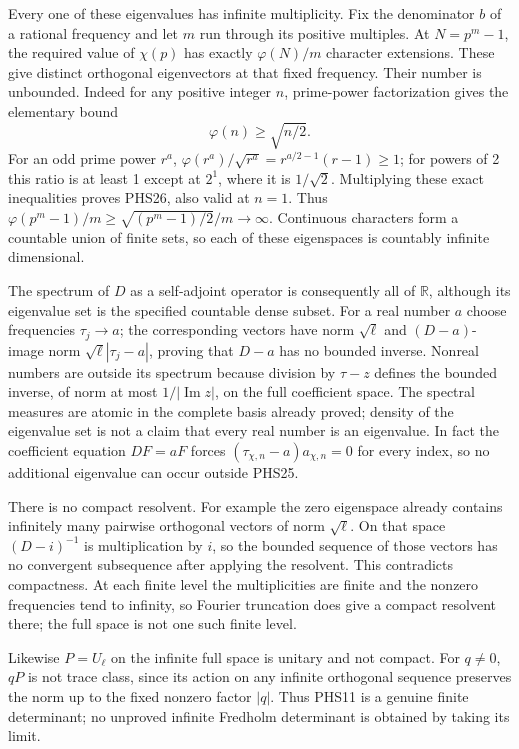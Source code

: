 Every one of these eigenvalues has infinite multiplicity.
Fix the denominator $b$ of a rational frequency and let $m$ run
through its positive multiples. At $N=p^m-1$, the required value
of $\chi(p)$ has exactly $\varphi(N)/m$ character extensions.
These give distinct orthogonal eigenvectors at that fixed frequency.
Their number is unbounded. Indeed for any positive integer $n$,
prime-power factorization gives the elementary bound
\begin{equation}\tag{PHS26}
 \varphi(n)\ge\sqrt{n/2}.
\end{equation}
For an odd prime power $r^a$,
$\varphi(r^a)/\sqrt{r^a}=r^{a/2-1}(r-1)\ge1$;
for powers of 2 this ratio is at least 1 except at $2^1$,
where it is $1/\sqrt2$. Multiplying these exact inequalities
proves PHS26, also valid at $n=1$. Thus
$\varphi(p^m-1)/m\ge\sqrt{(p^m-1)/2}/m\to\infty$.
Continuous characters form a countable union of finite sets, so
each of these eigenspaces is countably infinite dimensional.

The spectrum of $D$ as a self-adjoint operator is consequently
all of $\mathbb R$, although its eigenvalue set is the specified
countable dense subset. For a real number $a$ choose frequencies
$\tau_j\to a$; the corresponding vectors have norm $\sqrt\ell$
and $(D-a)$-image norm $\sqrt\ell|\tau_j-a|$, proving that
$D-a$ has no bounded inverse. Nonreal numbers are outside its
spectrum because division by $\tau-z$ defines the bounded inverse,
of norm at most $1/|\operatorname{Im}z|$, on the full coefficient
space. The spectral measures are atomic in the complete basis
already proved; density of the eigenvalue set is not a claim that
every real number is an eigenvalue.
In fact the coefficient equation $DF=aF$ forces
$(\tau_{\chi,n}-a)a_{\chi,n}=0$ for every index, so no additional
eigenvalue can occur outside PHS25.

There is no compact resolvent. For example the zero eigenspace
already contains infinitely many pairwise orthogonal vectors of
norm $\sqrt\ell$. On that space $(D-i)^{-1}$ is multiplication
by $i$, so the bounded sequence of those vectors has no convergent
subsequence after applying the resolvent. This contradicts
compactness. At each finite level the multiplicities are finite
and the nonzero frequencies tend to infinity, so Fourier truncation
does give a compact resolvent there; the full space is not one
such finite level.

Likewise $P=U_\ell$ on the infinite full space is unitary and
not compact. For $q\ne0$, $qP$ is not trace class, since its
action on any infinite orthogonal sequence preserves the norm
up to the fixed nonzero factor $|q|$. Thus PHS11 is a genuine
finite determinant; no unproved infinite Fredholm determinant is
obtained by taking its limit.

